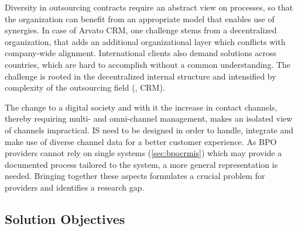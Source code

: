 Diversity in outsourcing contracts require an abstract view on processes, so that the organization can benefit from an appropriate model that enables use of synergies. In case of Arvato CRM, one challenge stems from a decentralized organization, that adds an additional organizational layer which conflicts with company-wide alignment. International clients also demand solutions across countries, which are hard to accomplish without a common understanding. The challenge is rooted in the decentralized internal structure and intensified by complexity of the outsourcing field (\eg, \acrshort{CRM}).

The change to a digital society and with it the increase in contact channels, thereby requiring multi- and omni-channel management, makes an isolated view of channels impractical. \acrshort{IS} need to be designed in order to handle, integrate and make use of diverse channel data for a better customer experience. As BPO providers cannot rely on single systems (\cf \ref{sec:bpocrmis}) which may provide a documented process tailored to the system, a more general representation is needed. Bringing together these aspects formulates a crucial problem for providers and identifies a research gap. 



\subsection{Solution Objectives}


